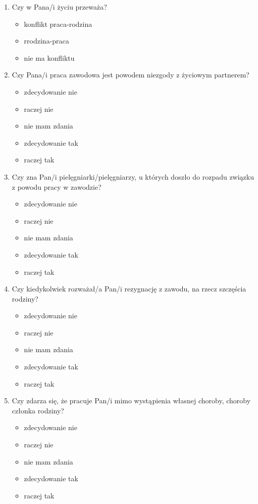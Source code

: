 \documentclass[a4paper,12pt,twoside,openright]{mwrep}
\begin{document}
\begin{enumerate}[label=\arabic*)]
			\item{ Czy w Pana/i życiu przeważa?}
		\begin{itemize}
			\item{konflikt praca-rodzina}
			\item{rrodzina-praca}
			\item{nie ma konfliktu}
			\end{itemize}
		\vspace{\baselineskip}
		
			\item{Czy Pana/i praca zawodowa jest powodem niezgody z życiowym partnerem?}
		\begin{itemize}
			\item{zdecydowanie nie}
			\item{raczej nie}
			\item{nie mam zdania}
			\item{zdecydowanie tak}
			\item{raczej tak}
		\end{itemize}
		\vspace{\baselineskip}
		
			\item{Czy zna Pan/i pielęgniarki/pielęgniarzy, u których doszło do rozpadu związku z powodu pracy w zawodzie?}
		\begin{itemize}
			\item{zdecydowanie nie}
			\item{raczej nie}
			\item{nie mam zdania}
			\item{zdecydowanie tak}
			\item{raczej tak}
		\end{itemize}
		\vspace{\baselineskip}
		
			\item{Czy kiedykolwiek rozważał/a Pan/i rezygnację z zawodu, na rzecz szczęścia rodziny?}
		\begin{itemize}
			\item{zdecydowanie nie}
			\item{raczej nie}
			\item{nie mam zdania}
			\item{zdecydowanie tak}
			\item{raczej tak}
		\end{itemize}
		\vspace{\baselineskip}
		
			\item{Czy zdarza się, że pracuje Pan/i mimo wystąpienia własnej choroby, choroby członka rodziny?}
		\begin{itemize}
			\item{zdecydowanie nie}
			\item{raczej nie}
			\item{nie mam zdania}
			\item{zdecydowanie tak}
			\item{raczej tak}
		\end{itemize}
		\vspace{\baselineskip}
		

\end{enumerate}
\end{document}

